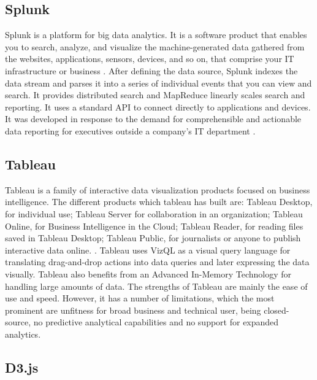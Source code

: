 \subsection{Splunk}

    Splunk is a platform for big data analytics. It is a software
    product that enables you to search, analyze, and visualize the
    machine-generated data gathered from the websites, applications,
    sensors, devices, and so on, that comprise your IT infrastructure
    or business \cite{www-splunk}. After defining the data source,
    Splunk indexes the data stream and parses it into a series of
    individual events that you can view and search. It provides
    distributed search and MapReduce linearly scales search and
    reporting. It uses a standard API to connect directly to
    applications and devices. It was developed in response to the
    demand for comprehensible and actionable data reporting for
    executives outside a company's IT department \cite{www-splunk}.
	  
\subsection{Tableau}

    \cite{www-tableau-tutorial} Tableau is a family of interactive
    data visualization products focused on business intelligence. The
    different products which tableau has built are: Tableau Desktop,
    for individual use; Tableau Server for collaboration in an
    organization; Tableau Online, for Business Intelligence in the
    Cloud; Tableau Reader, for reading files saved in Tableau Desktop;
    Tableau Public, for journalists or anyone to publish interactive
    data online. \cite{www-tableau-web}. Tableau uses VizQL as a
    visual query language for translating drag-and-drop actions into
    data queries and later expressing the data visually. Tableau also
    benefits from an Advanced In-Memory Technology for handling large
    amounts of data.  The strengths of Tableau are mainly the ease of
    use and speed.  However, it has a number of limitations, which the
    most prominent are unfitness for broad business and technical
    user, being closed-source, no predictive analytical capabilities
    and no support for expanded analytics.

\subsection{D3.js}

